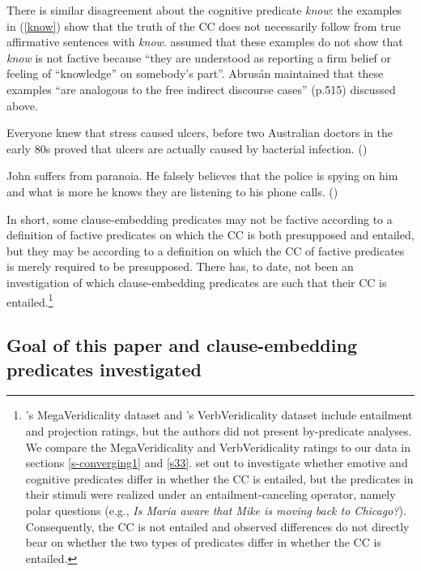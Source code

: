 \documentclass[11pt,fleqn]{article}
\newcommand{\6}{\mbox{$[\hspace*{-.6mm}[$}}
\newcommand{\9}{\mbox{$]\hspace*{-.6mm}]$}}
\newcommand{\citepos}[1]{\citeauthor{#1}'s \citeyear{#1}}
\begin{document}
There is similar disagreement about the cognitive predicate {\em know}: the examples in (\ref{know}) show that the truth of the CC does not necessarily follow from true affirmative sentences with {\em know}. \citet{abrusan2011} assumed that these examples do not show that {\em know} is not factive because ``they are understood as reporting a firm belief or feeling of ``knowledge'' on somebody's part''. Abrus\'an maintained that these examples ``are analogous to the free indirect discourse cases'' (p.515) discussed above.

\begin{exe}
\ex\label{know}
\begin{xlist}
\ex Everyone knew that stress caused ulcers, before two Australian doctors in the early 80s proved that ulcers are actually caused by bacterial infection. \hfill (\citealt[501]{hazlett2010})

\ex John suffers from paranoia. He falsely believes that the police is spying on him and what is more he knows they are listening to his phone calls. \hfill (\citealt[514]{abrusan2011})
\end{xlist}
\end{exe}

In short, some clause-embedding predicates may not be factive according to a definition of factive predicates on which the CC is both presupposed and entailed, but they may be according to a definition on which the CC of factive predicates is merely required to be presupposed. There has, to date, not been an investigation of which clause-embedding predicates are such that their CC is entailed.\footnote{\citepos{white-rawlins-nels2018} MegaVeridicality dataset  and \citepos{ross-pavlick2019} VerbVeridicality dataset  include entailment and projection ratings, but the authors did not present by-predicate analyses. We compare the MegaVeridicality and VerbVeridicality ratings to our data in sections \ref{s-converging1} and  \ref{s33}. \citet{djaerv-etal2016} set out to investigate whether emotive and cognitive predicates differ in whether the CC is entailed, but the predicates in their stimuli were realized under an entailment-canceling operator, namely polar questions (e.g., {\em Is Maria aware that Mike is moving back to Chicago?}). Consequently, the CC is not entailed and observed differences do not directly bear on whether the two types of predicates differ in whether the CC is entailed.} 

\subsection{Goal of this paper and clause-embedding predicates investigated}
\end{document}
